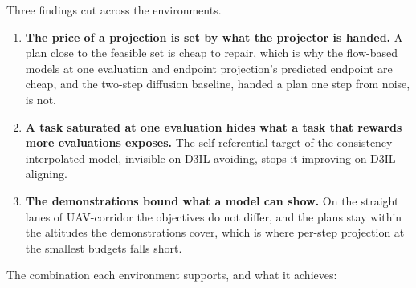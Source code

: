 Three findings cut across the environments.

\begin{enumerate}
  \item \textbf{The price of a projection is set by what the projector is handed.} A plan close to the
    feasible set is cheap to repair, which is why the flow-based models at one evaluation and endpoint
    projection's predicted endpoint are cheap, and the two-step diffusion baseline, handed a plan one step
    from noise, is not.
  \item \textbf{A task saturated at one evaluation hides what a task that rewards more evaluations exposes.}
    The self-referential target of the consistency-interpolated model, invisible on D3IL-avoiding, stops it
    improving on D3IL-aligning.
  \item \textbf{The demonstrations bound what a model can show.} On the straight lanes of UAV-corridor the
    objectives do not differ, and the plans stay within the altitudes the demonstrations cover, which is
    where per-step projection at the smallest budgets falls short.
\end{enumerate}

The combination each environment supports, and what it achieves:

